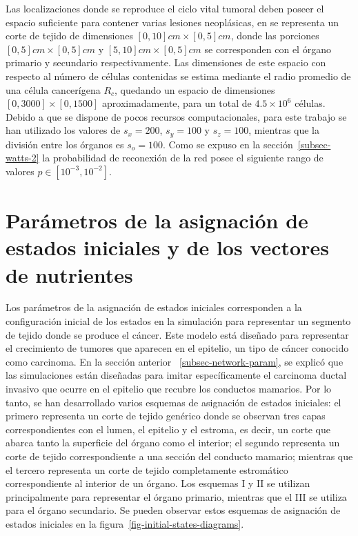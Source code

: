 Las localizaciones donde se reproduce el ciclo vital tumoral deben poseer el espacio suficiente para contener varias lesiones neopl\'asicas, en \cite{viabarre2019} se representa un corte de tejido de dimensiones $[0,10]cm \times [0,5]cm$, donde las porciones $[0,5]cm \times [0,5]cm$ y $[5,10]cm \times [0,5]cm$ se corresponden con el \'organo primario y secundario respectivamente. Las dimensiones de este espacio con respecto al n\'umero de c\'elulas contenidas se estima mediante el radio promedio de una c\'elula cancer\'igena $R_c$, quedando un espacio de dimensiones $[0, 3000] \times [0, 1500]$ aproximadamente, para un total de $4$.$5 \times 10^6$ c\'elulas. Debido a que se dispone de pocos recursos computacionales, para este trabajo se han utilizado los valores de $s_x = 200$, $s_y = 100$ y  $s_z = 100$, mientras que la divisi\'on entre los \'organos es $s_o = 100$. Como se expuso en la secci\'on~\ref{subsec-watts-2} la probabilidad de reconexi\'on de la red posee el siguiente rango de valores $p \in [10^{-3},10^{-2}]$.



\section{Par\'ametros de la asignaci\'on de estados iniciales y de los vectores de nutrientes}

Los parámetros de la asignación de estados iniciales corresponden a la configuración inicial de los estados en la simulación para representar un segmento de tejido donde se produce el cáncer. Este modelo está diseñado para representar el crecimiento de tumores que aparecen en el epitelio, un tipo de cáncer conocido como carcinoma. En la sección anterior ~\ref{subsec-network-param}, se explicó que las simulaciones están diseñadas para imitar específicamente el carcinoma ductal invasivo que ocurre en el epitelio que recubre los conductos mamarios. Por lo tanto, se han desarrollado varios esquemas de asignación de estados iniciales: el primero representa un corte de tejido genérico donde se observan tres capas correspondientes con el lumen, el epitelio y el estroma, es decir, un corte que abarca tanto la superficie del órgano como el interior; el segundo representa un corte de tejido correspondiente a una sección del conducto mamario; mientras que el tercero representa un corte de tejido completamente estromático correspondiente al interior de un órgano. Los esquemas I y II se utilizan principalmente para representar el órgano primario, mientras que el III se utiliza para el órgano secundario. Se pueden observar estos esquemas de asignación de estados iniciales en la figura~\ref{fig-initial-states-diagrams}.

